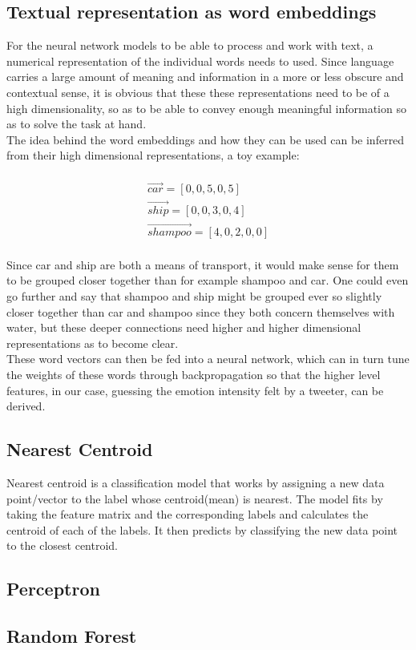 \subsection{Textual representation as word embeddings}
For the neural network models to be able to process and work with text, a numerical representation of the individual words needs to used. Since language carries a large amount of meaning and information in a more or less obscure and contextual sense, it is obvious that these these representations need to be of a high dimensionality, so as to be able to convey enough meaningful information so as to solve the task at hand.\\
The idea behind the word embeddings and how they can be used can be inferred from their high dimensional representations, a toy example:\\
\\
\begin{equation}
\begin{aligned}
\vec{car} = [0,0,5,0,5]\\
\vec{ship} = [0,0,3,0,4]\\
\vec{shampoo} = [4,0,2,0,0]
\end{aligned}
\end{equation}\\
Since car and ship are both a means of transport, it would make sense for them to be grouped closer together than for example shampoo and car. One could even go further and say that shampoo and ship might be grouped ever so slightly closer together than car and shampoo since they both concern themselves with water, but these deeper connections need higher and higher dimensional representations as to become clear.\\
These word vectors can then be fed into a neural network, which can in turn tune the weights of these words through backpropagation so that the higher level features, in our case, guessing the emotion intensity felt by a tweeter, can be derived.

\subsection{Nearest Centroid}
Nearest centroid is a classification model that works by assigning a new data point/vector to the label whose centroid(mean) is nearest. The model fits by taking the feature matrix and the corresponding labels and calculates the centroid of each of the labels. It then predicts by classifying the new data point to the closest centroid.
\subsection{Perceptron}
\subsection{Random Forest}
